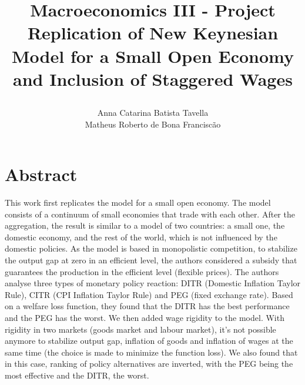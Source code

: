 \documentclass{article}
\title{\large{\textbf{Macroeconomics III - Project}} \\
\LARGE{Replication of New Keynesian Model for a Small Open Economy and Inclusion of Staggered Wages }
\author{Anna Catarina Batista Tavella\\Matheus Roberto de Bona Franciscão}}
\date{}
\begin{document}
\maketitle

\section*{Abstract}
This work first replicates the \cite{gali_monacelli} model for a small open economy. The model consists of a continuum of small economies that trade with each other. After the aggregation, the result is similar to a model of two countries: a small one, the domestic economy, and the rest of the world, which is not influenced by the domestic policies. As the model is based in monopolistic competition, to stabilize the output gap at zero in an efficient level, the authors considered a subsidy that guarantees the production in the efficient level (flexible prices). The authors analyse three types of monetary policy reaction: DITR (Domestic Inflation Taylor Rule), CITR (CPI Inflation Taylor Rule) and PEG (fixed exchange rate). Based on a welfare loss function, they found that the DITR has the best performance and the PEG has the worst. We then added wage rigidity to the model. With rigidity in two markets (goods market and labour market), it's not possible anymore to stabilize output gap, inflation of goods and inflation of wages at the same time (the choice is made to minimize the function loss). We also found that in this case, ranking of policy alternatives are inverted, with the PEG being the most effective and the DITR, the worst.
\end{document}
